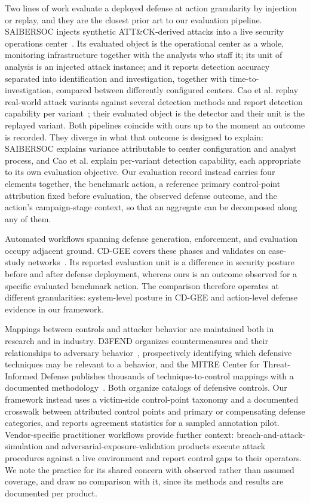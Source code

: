 Two lines of work evaluate a deployed defense at action granularity by injection or replay, and they are the closest prior art to our evaluation pipeline. SAIBERSOC injects synthetic ATT\&CK-derived attacks into a live security operations center~\cite{rosso2022saibersoc}. Its evaluated object is the operational center as a whole, monitoring infrastructure together with the analysts who staff it; its unit of analysis is an injected attack instance; and it reports detection accuracy separated into identification and investigation, together with time-to-investigation, compared between differently configured centers. Cao et al. replay real-world attack variants against several detection methods and report detection capability per variant~\cite{cao2016replay}; their evaluated object is the detector and their unit is the replayed variant. Both pipelines coincide with ours up to the moment an outcome is recorded. They diverge in what that outcome is designed to explain: SAIBERSOC explains variance attributable to center configuration and analyst process, and Cao et al. explain per-variant detection capability, each appropriate to its own evaluation objective. Our evaluation record instead carries four elements together, the benchmark action, a reference primary control-point attribution fixed before evaluation, the observed defense outcome, and the action's campaign-stage context, so that an aggregate can be decomposed along any of them.

Automated workflows spanning defense generation, enforcement, and evaluation occupy adjacent ground. CD-GEE covers these phases and validates on case-study networks~\cite{enoch2022cdgee}. Its reported evaluation unit is a difference in security posture before and after defense deployment, whereas ours is an outcome observed for a specific evaluated benchmark action. The comparison therefore operates at different granularities: system-level posture in CD-GEE and action-level defense evidence in our framework.

Mappings between controls and attacker behavior are maintained both in research and in industry. D3FEND organizes countermeasures and their relationships to adversary behavior~\cite{mitreD3FEND,kaloroumakis2021d3fend}, prospectively identifying which defensive techniques may be relevant to a behavior, and the MITRE Center for Threat-Informed Defense publishes thousands of technique-to-control mappings with a documented methodology~\cite{mitreCTIDMappings}. Both organize catalogs of defensive controls. Our framework instead uses a victim-side control-point taxonomy and a documented crosswalk between attributed control points and primary or compensating defense categories, and reports agreement statistics for a sampled annotation pilot. Vendor-specific practitioner workflows provide further context: breach-and-attack-simulation and adversarial-exposure-validation products execute attack procedures against a live environment and report control gaps to their operators. We note the practice for its shared concern with observed rather than assumed coverage, and draw no comparison with it, since its methods and results are documented per product.

